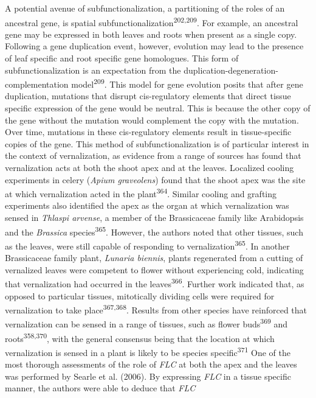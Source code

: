 \documentclass[12pt,]{book}
\begin{document}
A potential avenue of subfunctionalization, a partitioning of the roles
of an ancestral gene, is spatial
subfunctionalization\textsuperscript{202,209}. For example, an ancestral
gene may be expressed in both leaves and roots when present as a single
copy. Following a gene duplication event, however, evolution may lead to
the presence of leaf specific and root specific gene homologues. This
form of subfunctionalization is an expectation from the
duplication-degeneration-complementation model\textsuperscript{209}.
This model for gene evolution posits that after gene duplication,
mutations that disrupt cis-regulatory elements that direct tissue
specific expression of the gene would be neutral. This is because the
other copy of the gene without the mutation would complement the copy
with the mutation. Over time, mutations in these cis-regulatory elements
result in tissue-specific copies of the gene. This method of
subfunctionalization is of particular interest in the context of
vernalization, as evidence from a range of sources has found that
vernalization acts at both the shoot apex and at the leaves. Localized
cooling experiments in celery (\emph{Apium graveolens}) found that the
shoot apex was the site at which vernalization acted in the
plant\textsuperscript{364}. Similar cooling and grafting experiments
also identified the apex as the organ at which vernalization was sensed
in \emph{Thlaspi arvense}, a member of the Brassicaceae family like
Arabidopsis and the \emph{Brassica} species\textsuperscript{365}.
However, the authors noted that other tissues, such as the leaves, were
still capable of responding to vernalization\textsuperscript{365}. In
another Brassicaceae family plant, \emph{Lunaria biennis}, plants
regenerated from a cutting of vernalized leaves were competent to flower
without experiencing cold, indicating that vernalization had occurred in
the leaves\textsuperscript{366}. Further work indicated that, as opposed
to particular tissues, mitotically dividing cells were required for
vernalization to take place\textsuperscript{367,368}. Results from other
species have reinforced that vernalization can be sensed in a range of
tissues, such as flower buds\textsuperscript{369} and
roots\textsuperscript{358,370}, with the general consensus being that
the location at which vernalization is sensed in a plant is likely to be
species specific\textsuperscript{371} One of the most thorough
assessments of the role of \emph{FLC} at both the apex and the leaves
was performed by Searle et al. (2006). By expressing \emph{FLC} in a
tissue specific manner, the authors were able to deduce that \emph{FLC}
\end{document}
